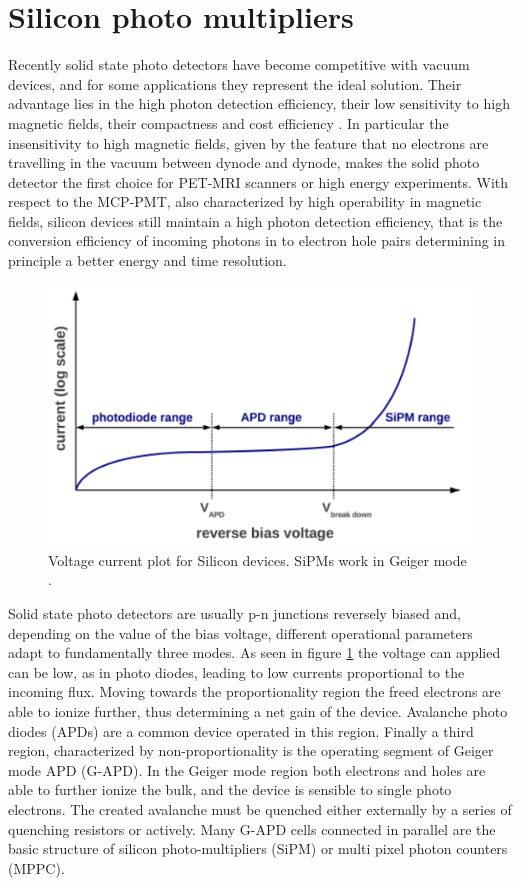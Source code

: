 \section{Silicon photo multipliers}
Recently solid state photo detectors have become competitive with vacuum devices, and for some applications they represent the ideal solution. Their advantage lies in the high photon detection efficiency, their low sensitivity to high magnetic fields, their compactness and cost efficiency \cite{Dolgoshein2003}.
In particular the insensitivity to high magnetic fields, given by the feature that no electrons are travelling in the vacuum between dynode and dynode, makes the solid photo detector the first choice for PET-MRI scanners or high energy experiments. With respect to the MCP-PMT, also characterized by high operability in magnetic fields, silicon devices still maintain a high photon detection efficiency, that is the conversion efficiency of incoming photons in to electron hole pairs determining in principle a better energy and time resolution.
\begin{figure}[htbp]
\begin{center}
\includegraphics[width=12cm]{../Pictures/Chapter_3/avalanche.pdf}
\end{center}
\caption[I-V plot Silicon detectors]{Voltage current plot for Silicon devices. SiPMs work in Geiger mode \cite{Gundacker2014}.}
\label{fig:avalanche}
\end{figure}

Solid state photo detectors are usually p-n junctions reversely biased and, depending on the value of the bias voltage, different operational parameters adapt to fundamentally three modes.
As seen in figure \ref{fig:avalanche} the voltage can applied can be low, as in photo diodes, leading to low currents proportional to the incoming flux. Moving towards the proportionality region the freed electrons are able to ionize further, thus determining a net gain of the device. Avalanche photo diodes (APDs) are a common device operated in this region.
Finally a third region, characterized by non-proportionality is the operating segment of Geiger mode APD (G-APD). In the Geiger mode region both electrons and holes are able to further ionize the bulk, and the device is sensible to single photo electrons. The created avalanche must be quenched either externally by a series of quenching resistors or actively.
Many G-APD cells connected in parallel are the basic structure of silicon photo-multipliers (SiPM) or multi pixel photon counters (MPPC).

